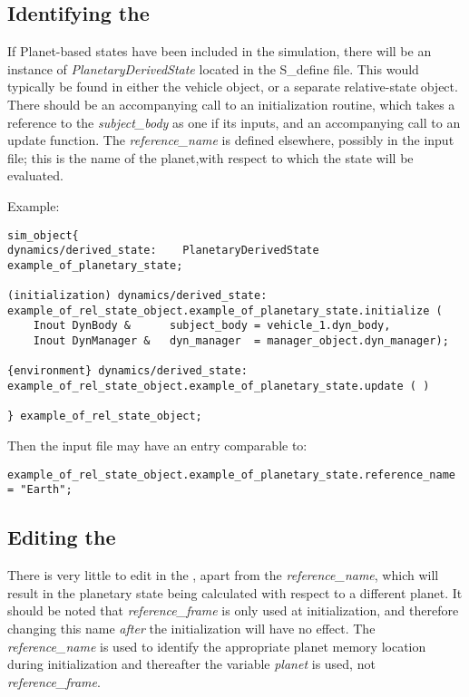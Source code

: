 %
%
% 
%


\label{sec:planetaryuseranalysis}

\subsection{Identifying the \PlanetaryDescT}
If Planet-based states have been included in the simulation, there will be an instance of \textit{PlanetaryDerivedState} located in the S\_define file.  This would typically be found in either the vehicle object, or a separate relative-state object.  There should be an accompanying call to an initialization routine, which takes a reference to the \textit{subject\_body} as one if its inputs, and an accompanying call to an update function.  The \textit{reference\_name} is defined elsewhere, possibly in the input file; this is the name of the planet,with respect to which the state will be evaluated.

Example:
\begin{verbatim}
sim_object{
dynamics/derived_state:    PlanetaryDerivedState example_of_planetary_state;

(initialization) dynamics/derived_state:
example_of_rel_state_object.example_of_planetary_state.initialize (
    Inout DynBody &      subject_body = vehicle_1.dyn_body,
    Inout DynManager &   dyn_manager  = manager_object.dyn_manager);
    
{environment} dynamics/derived_state:
example_of_rel_state_object.example_of_planetary_state.update ( )

} example_of_rel_state_object;
\end{verbatim}

Then the input file may have an entry comparable to:
\begin{verbatim}
example_of_rel_state_object.example_of_planetary_state.reference_name = "Earth";
\end{verbatim}

\subsection{Editing the \PlanetaryDescT}
There is very little to edit in the \PlanetaryDesc, apart from the \textit{reference\_name}, which will result in the planetary state being calculated with respect to a different planet.  It should be noted that \textit{reference\_frame} is only used at initialization, and therefore changing this name \textit{after} the initialization will have no effect.  The \textit{reference\_name} is used to identify the appropriate planet memory location during initialization and thereafter the variable \textit{planet} is used, not \textit{reference\_frame}.

